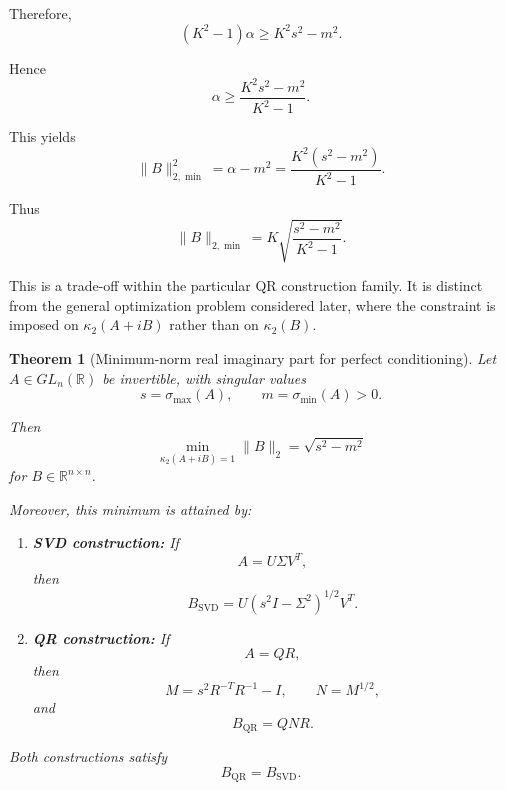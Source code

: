 \documentclass[11pt, reqno, a4paper]{amsart}
\theoremstyle{plain}
\newtheorem{theorem}{Theorem}[section]
\theoremstyle{definition}
\theoremstyle{remark}
\numberwithin{equation}{section}
\begin{document}
Therefore,
\[
(K^2-1)\alpha
\geq
K^2s^2-m^2.
\]

Hence
\[
\boxed{
\alpha\geq
\frac{K^2s^2-m^2}{K^2-1}.
}
\]

This yields
\[
\|B\|_{2,\min}^2
=
\alpha-m^2
=
\frac{K^2(s^2-m^2)}{K^2-1}.
\]

Thus
\[
\boxed{
\|B\|_{2,\min}
=
K\sqrt{\frac{s^2-m^2}{K^2-1}}.
}
\]

This is a trade-off within the particular QR construction family. It is distinct from the general optimization problem considered later, where the constraint is imposed on $\kappa_2(A+iB)$ rather than on $\kappa_2(B)$.

\begin{theorem}[Minimum-norm real imaginary part for perfect conditioning]
Let $A\in GL_n(\mathbb{R})$ be invertible, with singular values
\[
s=\sigma_{\max}(A),
\qquad
m=\sigma_{\min}(A)>0.
\]

Then
\[
\boxed{
\min_{\kappa_2(A+iB)=1}\|B\|_2
=
\sqrt{s^2-m^2}
}
\]
for $B\in\mathbb{R}^{n\times n}$.

Moreover, this minimum is attained by:

\begin{enumerate}
    \item \textbf{SVD construction:} If
    \[
    A=U\Sigma V^T,
    \]
    then
    \[
    B_{\mathrm{SVD}}
    =
    U(s^2I-\Sigma^2)^{1/2}V^T.
    \]

    \item \textbf{QR construction:} If
    \[
    A=QR,
    \]
    then
    \[
    M=s^2R^{-T}R^{-1}-I,
    \qquad
    N=M^{1/2},
    \]
    and
    \[
    B_{\mathrm{QR}}=QNR.
    \]
\end{enumerate}

Both constructions satisfy
\[
B_{\mathrm{QR}}=B_{\mathrm{SVD}}.
\]
\end{theorem}
\end{document}
